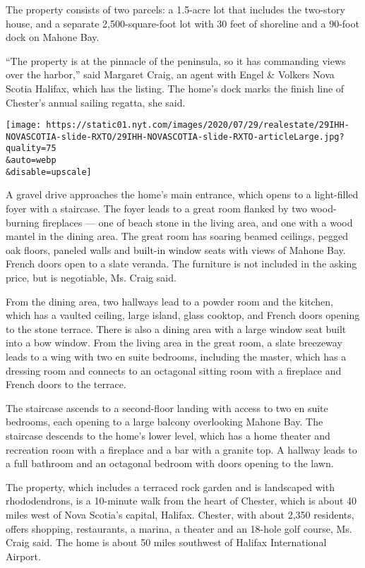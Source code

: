 The property consists of two parcels: a 1.5-acre lot that includes the
two-story house, and a separate 2,500-square-foot lot with 30 feet of
shoreline and a 90-foot dock on Mahone Bay.

``The property is at the pinnacle of the peninsula, so it has commanding
views over the harbor,'' said Margaret Craig, an agent with Engel \&
Volkers Nova Scotia Halifax, which has the listing. The home's dock
marks the finish line of Chester's annual sailing regatta, she said.

\texttt{[image: https://static01.nyt.com/images/2020/07/29/realestate/29IHH-NOVASCOTIA-slide-RXTO/29IHH-NOVASCOTIA-slide-RXTO-articleLarge.jpg?quality=75\\\&auto=webp\\\&disable=upscale]}

A gravel drive approaches the home's main entrance, which opens to a
light-filled foyer with a staircase. The foyer leads to a great room
flanked by two wood-burning fireplaces --- one of beach stone in the
living area, and one with a wood mantel in the dining area. The great
room has soaring beamed ceilings, pegged oak floors, paneled walls and
built-in window seats with views of Mahone Bay. French doors open to a
slate veranda. The furniture is not included in the asking price, but is
negotiable, Ms. Craig said.

From the dining area, two hallways lead to a powder room and the
kitchen, which has a vaulted ceiling, large island, glass cooktop, and
French doors opening to the stone terrace. There is also a dining area
with a large window seat built into a bow window. From the living area
in the great room, a slate breezeway leads to a wing with two en suite
bedrooms, including the master, which has a dressing room and connects
to an octagonal sitting room with a fireplace and French doors to the
terrace.

The staircase ascends to a second-floor landing with access to two en
suite bedrooms, each opening to a large balcony overlooking Mahone Bay.
The staircase descends to the home's lower level, which has a home
theater and recreation room with a fireplace and a bar with a granite
top. A hallway leads to a full bathroom and an octagonal bedroom with
doors opening to the lawn.

The property, which includes a terraced rock garden and is landscaped
with rhododendrons, is a 10-minute walk from the heart of Chester, which
is about 40 miles west of Nova Scotia's capital, Halifax. Chester, with
about 2,350 residents, offers shopping, restaurants, a marina, a theater
and an 18-hole golf course, Ms. Craig said. The home is about 50 miles
southwest of Halifax International Airport.

